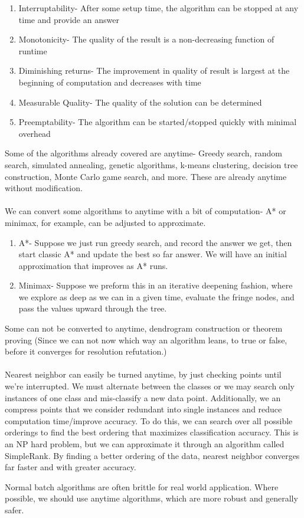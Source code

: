 \documentclass{chezarticle}
\begin{document}
\begin{note}
\begin{enumerate}
    \item Interruptability- After some setup time, the algorithm can be stopped at any time and provide an answer
    \item Monotonicity- The quality of the result is a non-decreasing function of runtime
    \item Diminishing returns- The improvement in quality of result is largest at the beginning of computation and decreases with time
    \item Measurable Quality- The quality of the solution can be determined 
    \item Preemptability- The algorithm can be started/stopped quickly with minimal overhead
\end{enumerate}
\end{note}
Some of the algorithms already covered are anytime- Greedy search, random search, simulated annealing, genetic algorithms, k-means clustering, decision tree construction, Monte Carlo game search, and more. These are already anytime without modification.
\\
\\
We can convert some algorithms to anytime with a bit of computation- A* or minimax, for example, can be adjusted to approximate.
\begin{proposition}
\begin{enumerate}
    \item A*- Suppose we just run greedy search, and record the answer we get, then start classic A* and update the best so far answer. We will have an initial approximation that improves as A* runs.
    \item Minimax- Suppose we preform this in an iterative deepening fashion, where we explore as deep as we can in a given time, evaluate the fringe nodes, and pass the values upward through the tree.
\end{enumerate}
\end{proposition}
Some can not be converted to anytime, dendrogram construction or theorem proving (Since we can not now which way an algorithm leans, to true or false, before it converges for resolution refutation.)\\
\\
Nearest neighbor can easily be turned anytime, by just checking points until we're interrupted. We must alternate between the classes or we may search only instances of one class and mis-classify a new data point. Additionally, we an compress points that we consider redundant into single instances and reduce computation time/improve accuracy. To do this, we can search over all possible orderings to find the best ordering that maximizes classification accuracy. This is an NP hard problem, but we can approximate it through an algorithm called SimpleRank. By finding a better ordering of the data, nearest neighbor converges far faster and with greater accuracy. 
\begin{note}
Normal batch algorithms are often brittle for real world application. Where possible, we should use anytime algorithms, which are more robust and generally safer. 
\end{note}
\end{document}
